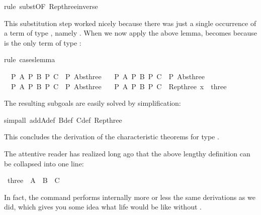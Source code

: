 \begin{isabellebody}
\begin{isamarkuptxt}
\end{isamarkuptxt}%
rule\ subst{\isacharbrackleft}OF\ Rep{\isacharunderscore}three{\isacharunderscore}inverse{\isacharbrackright}{\isacharparenright}%
\begin{isamarkuptxt}%
\noindent
This substitution step worked nicely because there was just a single
occurrence of a term of type , namely .
When we now apply the above lemma,  becomes  because  is the only term of type :%
\end{isamarkuptxt}%
rule\ cases{\isacharunderscore}lemma{\isacharparenright}%
\begin{isamarkuptxt}%
\begin{isabelle}%
\ {}{\isachardot}\ {\isasymlbrakk}P\ A{\isacharsemicolon}\ P\ B{\isacharsemicolon}\ P\ C{\isasymrbrakk}\ {\isasymLongrightarrow}\ P\ {\isacharparenleft}Abs{\isacharunderscore}three\ {}{\isacharparenright}\isanewline
\ {}{\isachardot}\ {\isasymlbrakk}P\ A{\isacharsemicolon}\ P\ B{\isacharsemicolon}\ P\ C{\isasymrbrakk}\ {\isasymLongrightarrow}\ P\ {\isacharparenleft}Abs{\isacharunderscore}three\ {}{\isacharparenright}\isanewline
\ {}{\isachardot}\ {\isasymlbrakk}P\ A{\isacharsemicolon}\ P\ B{\isacharsemicolon}\ P\ C{\isasymrbrakk}\ {\isasymLongrightarrow}\ P\ {\isacharparenleft}Abs{\isacharunderscore}three\ {}{\isacharparenright}\isanewline
\ {}{\isachardot}\ {\isasymlbrakk}P\ A{\isacharsemicolon}\ P\ B{\isacharsemicolon}\ P\ C{\isasymrbrakk}\ {\isasymLongrightarrow}\ Rep{\isacharunderscore}three\ x\ {\isasymin}\ three%
\end{isabelle}
The resulting subgoals are easily solved by simplification:%
\end{isamarkuptxt}%
simp{\isacharunderscore}all\ add{\isacharcolon}A{\isacharunderscore}def\ B{\isacharunderscore}def\ C{\isacharunderscore}def\ Rep{\isacharunderscore}three{\isacharparenright}\isanewline
{}%
\begin{isamarkuptext}%
\noindent
This concludes the derivation of the characteristic theorems for
type .

The attentive reader has realized long ago that the
above lengthy definition can be collapsed into one line:%
\end{isamarkuptext}%
\ three{\isacharprime}\ {\isacharequal}\ A\ {\isacharbar}\ B\ {\isacharbar}\ C%
\begin{isamarkuptext}%
\noindent
In fact, the  command performs internally more or less
the same derivations as we did, which gives you some idea what life would be
like without .


\end{isamarkuptext}
\end{isabellebody}
